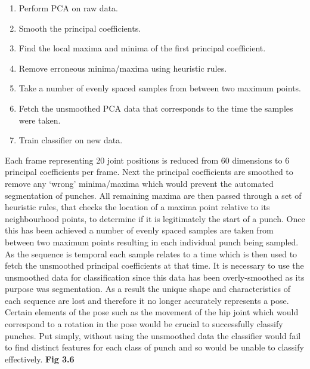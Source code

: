 \begin{enumerate}[noitemsep]
  \item Perform PCA on raw data.
  \item Smooth the principal coefficients.
  \item Find the local maxima and minima of the first principal coefficient.
  \item Remove erroneous minima/maxima using heuristic rules.
  \item Take a number of evenly spaced samples from between two maximum points.
  \item Fetch the unsmoothed PCA data that corresponds to the time the samples were taken.
  \item Train classifier on new data.
\end{enumerate}
Each frame representing 20 joint positions is reduced from 60 dimensions to 6 principal coefficients per frame. Next the principal coefficients are smoothed to remove any `wrong' minima/maxima which would prevent the automated segmentation of punches. All remaining maxima are then passed through a set of heuristic rules, that checks the location of a maxima point relative to its neighbourhood points, to determine if it is legitimately the start of a punch. Once this has been achieved a number of evenly spaced samples are taken from between two maximum points resulting in each individual punch being sampled. As the sequence is temporal each sample relates to a time which is then used to fetch the unsmoothed principal coefficients at that time. It is necessary to use the unsmoothed data for classification since this data has been overly-smoothed as its purpose was segmentation. As a result the unique shape and characteristics of each sequence are lost and therefore it no longer accurately represents a pose. Certain elements of the pose such as the movement of the hip joint which would correspond to a rotation in the pose would be crucial to successfully classify punches. Put simply, without using the unsmoothed data the classifier would fail to find distinct features for each class of punch and so would be unable to classify effectively. {\bf Fig 3.6}


